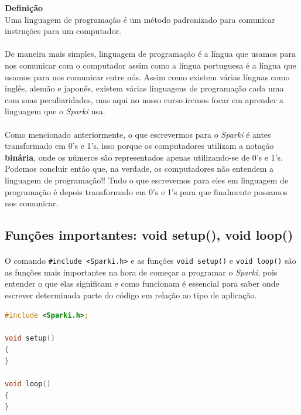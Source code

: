     \begin{center}
    \textbf{Definição} \\
    Uma linguagem de programação é um método padronizado para comunicar instruções para um computador.
    \end{center} \par
    
\paragraph{}
De maneira mais simples, linguagem de programação é a língua que usamos para nos comunicar com o computador assim como a língua portuguesa é a língua que usamos para nos comunicar entre nós. Assim como existem várias línguas como inglês, alemão e japonês, existem várias linguagens de programação cada uma com suas peculiaridades, mas aqui no nosso curso iremos focar em aprender a linguagem que o \textit{Sparki} usa.

\paragraph{}
Como mencionado anteriormente, o que escrevermos para o \textit{Sparki} é antes transformado em 0's e 1's, isso porque os computadores utilizam a notação \textbf{binária}, onde os números são representados apenas utilizando-se de 0's e 1's. Podemos concluir então que, na verdade, os computadores não entendem a linguagem de programação!! Tudo o que escrevemos para eles em linguagem de programação é depois transformado em 0's e 1's para que finalmente possamos nos comunicar.
    
 
\subsection{Funções importantes: void setup(), void loop()}
    
    \paragraph{}
    O comando \lstinline[columns=fixed]{#include <Sparki.h>} e as funções \lstinline[columns=fixed]{void setup()} e \lstinline[columns=fixed]{void loop()} são as funções mais importantes na hora de começar a programar o \textit{Sparki}, pois entender o que elas significam e como funcionam é essencial para saber onde escrever determinada parte do código em relação ao tipo de aplicação.
    
    \begin{lstlisting}[language=C]
#include <Sparki.h>;

void setup()
{
}

void loop()
{
}
\end{lstlisting}


